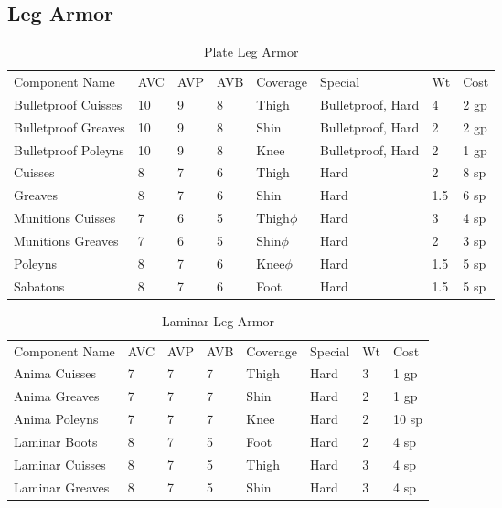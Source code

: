 \documentclass[oneside,11pt,english]{book}
\begin{document}
\subsection{Leg Armor}
\begin{longtabu} to 
	\caption{Plate Leg Armor}
	\label{tab:Plate Leg Armor}\\
Component Name&AVC&AVP&AVB& Coverage& Special& Wt&Cost\\
Bulletproof Cuisses& 10& 9& 8& Thigh& Bulletproof, Hard& 4& 2 gp\\
Bulletproof Greaves& 10& 9& 8& Shin& Bulletproof, Hard& 2& 2 gp\\
Bulletproof Poleyns& 10& 9& 8& Knee& Bulletproof, Hard& 2& 1 gp\\
Cuisses& 8& 7& 6& Thigh& Hard& 2& 8 sp\\
Greaves& 8& 7& 6& Shin& Hard& 1.5& 6 sp\\
Munitions Cuisses& 7& 6& 5& Thigh$\phi$& Hard& 3& 4 sp\\
Munitions Greaves& 7& 6& 5& Shin$\phi$& Hard& 2& 3 sp\\
Poleyns& 8& 7& 6& Knee$\phi$& Hard& 1.5& 5 sp\\
Sabatons& 8& 7& 6& Foot& Hard& 1.5& 5 sp\\
\end{longtabu}

\begin{longtabu} to 
	\caption{Laminar Leg Armor}
	\label{tab:Laminar Leg Armor}\\
Component Name&AVC&AVP&AVB& Coverage& Special& Wt&Cost\\
Anima Cuisses& 7& 7& 7& Thigh& Hard& 3& 1 gp\\
Anima Greaves& 7& 7& 7& Shin& Hard& 2& 1 gp\\
Anima Poleyns& 7& 7& 7& Knee& Hard& 2& 10 sp\\
Laminar Boots& 8& 7& 5& Foot& Hard& 2& 4 sp\\
Laminar Cuisses& 8& 7& 5& Thigh& Hard& 3& 4 sp\\
Laminar Greaves& 8& 7& 5& Shin& Hard& 3& 4 sp\\
\end{longtabu}
\end{document}

